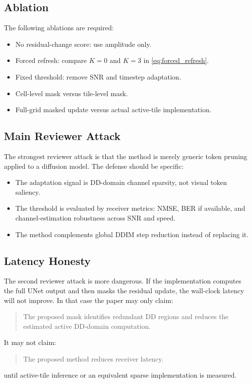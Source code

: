 \documentclass[10pt,journal]{IEEEtran}
\begin{document}
\subsection{Ablation}

The following ablations are required:
\begin{itemize}
  \item No residual-change score: use amplitude only.
  \item Forced refresh: compare $K=0$ and $K=3$ in \eqref{eq:forced_refresh}.
  \item Fixed threshold: remove SNR and timestep adaptation.
  \item Cell-level mask versus tile-level mask.
  \item Full-grid masked update versus actual active-tile implementation.
\end{itemize}

\subsection{Main Reviewer Attack}

The strongest reviewer attack is that the method is merely generic token
pruning applied to a diffusion model. The defense should be specific:
\begin{itemize}
  \item The adaptation signal is DD-domain channel sparsity, not visual token
  saliency.
  \item The threshold is evaluated by receiver metrics: NMSE, BER if available,
  and channel-estimation robustness across SNR and speed.
  \item The method complements global DDIM step reduction instead of replacing
  it.
\end{itemize}

\subsection{Latency Honesty}

The second reviewer attack is more dangerous. If the implementation computes
the full UNet output and then masks the residual update, the wall-clock latency
will not improve. In that case the paper may only claim:
\begin{quote}
The proposed mask identifies redundant DD regions and reduces the estimated
active DD-domain computation.
\end{quote}
It may not claim:
\begin{quote}
The proposed method reduces receiver latency.
\end{quote}
until active-tile inference or an equivalent sparse implementation is measured.
\end{document}
